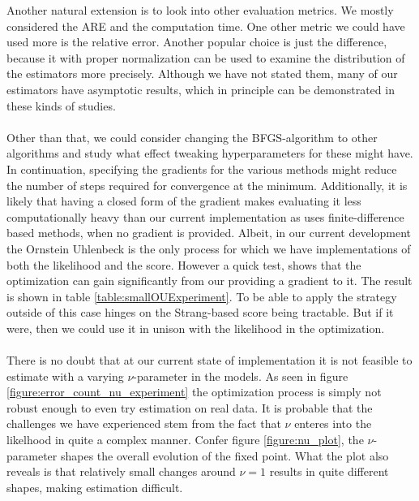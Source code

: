 Another natural extension is to look into other evaluation metrics. We mostly considered the ARE and the computation time. One other metric we could have used more is the relative error. Another popular choice is just the difference, because it with proper normalization can be used to examine the distribution of the estimators more precisely. Although we have not stated them, many of our estimators have asymptotic results, which in principle can be demonstrated in these kinds of studies.\\\\
Other than that, we could consider changing the BFGS-algorithm to other algorithms and study what effect tweaking hyperparameters for these might have. In continuation, specifying the gradients for the various methods might reduce the number of steps required for convergence at the minimum. Additionally, it is likely that having a closed form of the gradient makes evaluating it less computationally heavy than our current implementation as  uses finite-difference based methods, when no gradient is provided. Albeit, in our current development the Ornstein Uhlenbeck is the only process for which we have implementations of both the likelihood and the score. However a quick test, shows that the optimization can gain significantly from our providing a gradient to it. The result is shown in table \ref{table:smallOUExperiment}. To be able to apply the strategy outside of this case hinges on the Strang-based score being tractable. But if it were, then we could use it in unison with the likelihood in the optimization.\\\\
 There is no doubt that at our current state of implementation it is not feasible to estimate with a varying $\nu$-parameter in the models. As seen in figure \ref{figure:error_count_nu_experiment} the optimization process is simply not robust enough to even try estimation on real data. It is probable that the challenges we have experienced stem from the fact that $\nu$ enteres into the likelhood in quite a complex manner. Confer figure \ref{figure:nu_plot}, the $\nu$-parameter shapes the overall evolution of the fixed point. What the plot also reveals is that relatively small changes around $\nu = 1$ results in quite different shapes, making estimation difficult.
 
